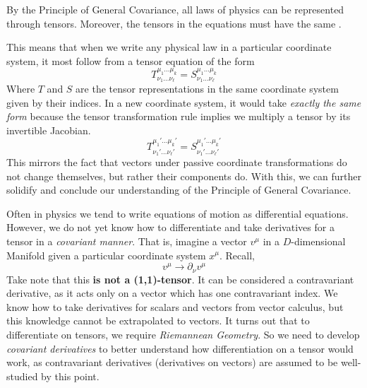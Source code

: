 \documentclass{article}
\begin{document}
 			\begin{lem}
 				By the Principle of General Covariance, all laws of physics can be represented through tensors. Moreover, the tensors in the equations must have the same .
 			\end{lem}
 			
 			This means that when we write any physical law in a particular coordinate system, it most follow from a tensor equation of the form
 			$$ T^{\mu_1 \dots \mu_k}_{\nu_1 \dots \nu_\ell} = S^{\mu_1 \dots \mu_k}_{\nu_1 \dots \nu_\ell} $$
 			Where $T$ and $S$ are the tensor representations in the same coordinate system given by their indices. In a new coordinate system, it would take \textit{exactly the same form} because the tensor transformation rule implies we multiply a tensor by its invertible Jacobian.
 			$$ T_{\nu_1' \dots \nu_\ell'}^{\mu_1' \dots \mu_k'} = S_{\nu_1' \dots \nu_\ell'}^{\mu_1' \dots \mu_k'}$$
 			This mirrors the fact that vectors under passive coordinate transformations do not change themselves, but rather their components do. With this, we can further solidify and conclude our understanding of the Principle of General Covariance. 
 
 			Often in physics we tend to write equations of motion as differential equations. However, we do not yet know how to differentiate and take derivatives for a tensor in a \textit{covariant manner}. That is, imagine a vector $v^\mu$ in a $D$-dimensional Manifold given a particular coordinate system $x^\mu$. Recall,
 			$$ v^{\mu} \to \partial_\nu v^\mu $$
 			Take note that this \textbf{is not a (1,1)-tensor}. It can be considered a contravariant derivative, as it acts only on a vector which has one contravariant index. We know how to take derivatives for scalars and vectors from vector calculus, but this knowledge cannot be extrapolated to vectors. It turns out that to differentiate on tensors, we require \textit{Riemannean Geometry}. So we need to develop \textit{covariant derivatives} to better understand how differentiation on a tensor would work, as contravariant derivatives (derivatives on vectors) are assumed to be well-studied by this point.
 			
\end{document}
